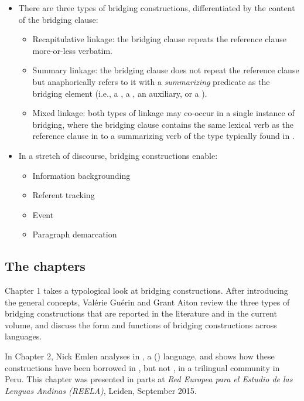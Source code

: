 \begin{refsection}
 \begin{itemize}  
\item There are three types of bridging constructions, differentiated by the content of the bridging clause: 
\begin{itemize}
\item Recapitulative linkage: the bridging clause repeats the reference clause more-or-less verbatim. 
\item  Summary linkage: the bridging clause does not repeat the reference clause but anaphorically refers to it with a \textit{summarizing} predicate as the bridging element (i.e., a , a , an auxiliary, or a ). 
\item Mixed linkage: both types of linkage may co-occur in a single instance of bridging, where the bridging clause contains the same lexical verb as the reference clause in  to a summarizing verb of the type typically found in .
\end{itemize}
\end{itemize}

 \begin{itemize} 
\item  In a stretch of discourse, bridging constructions enable:
\begin{itemize}
\item  Information backgrounding
\item  Referent tracking
\item  Event  
\item  Paragraph demarcation
\end{itemize}
\end{itemize}


\subsection*{The chapters}

Chapter 1 takes a typological look at bridging constructions. After introducing the general concepts, Valérie Guérin and Grant Aiton review the three types of bridging constructions that are reported in the literature and in the current volume, and discuss the form and functions of bridging constructions across languages. 

In Chapter 2, Nick Emlen analyses  in , a  () language, and shows how these constructions have been borrowed in , but not , in a trilingual community in Peru. This chapter was presented in parts at \textit{Red Europea para el Estudio de las Lenguas Andinas (REELA)}, Leiden, September 2015. 


\end{refsection}
